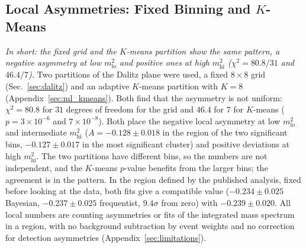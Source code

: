 \subsection{Local Asymmetries: Fixed Binning and $K$-Means}
\label{sec:comparison_local}
\emph{In short: the fixed grid and the $K$-means partition show the same pattern, a negative asymmetry at low $m^2_{\mathrm{lo}}$ and positive ones at high $m^2_{\mathrm{hi}}$ ($\chi^2=80.8/31$ and $46.4/7$).}
Two partitions of the Dalitz plane were used, a fixed $8\times8$ grid (Sec.~\ref{sec:dalitz}) and an adaptive $K$-means partition with $K=8$ (Appendix~\ref{sec:ml_kmeans}). Both find that the asymmetry is not uniform: $\chi^2=80.8$ for $31$ degrees of freedom for the grid and $46.4$ for $7$ for $K$-means ($p=3\times10^{-6}$ and $7\times10^{-8}$). Both place the negative local asymmetry at low $m^2_{\mathrm{lo}}$ and intermediate $m^2_{\mathrm{hi}}$ ($A=-0.128\pm0.018$ in the region of the two significant bins, $-0.127\pm0.017$ in the most significant cluster) and positive deviations at high $m^2_{\mathrm{hi}}$. The two partitions have different bins, so the numbers are not independent, and the $K$-means $p$-value benefits from the larger bins; the agreement is in the pattern. In the region defined by the published analysis, fixed before looking at the data, both fits give a compatible value ($-0.234\pm0.025$ Bayesian, $-0.237\pm0.025$ frequentist, $9.4\sigma$ from zero) with $-0.239\pm0.020$. All local numbers are counting asymmetries or fits of the integrated mass spectrum in a region, with no background subtraction by event weights and no correction for detection asymmetries (Appendix~\ref{sec:limitations}).
